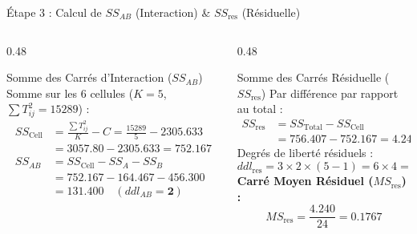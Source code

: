 \documentclass[aspectratio=169,10pt]{beamer}
\begin{document}
\begin{frame}{Étape 3 : Calcul de $SS_{AB}$ (Interaction) \& $SS_{\text{res}}$ (Résiduelle)}
  \begin{columns}[onlytextwidth, T]
    \begin{column}{0.48\linewidth}
      \begin{conceptbox}{Somme des Carrés d'Interaction ($SS_{AB}$)}
        \small
        Somme sur les 6 cellules ($K=5$, $\sum T_{ij}^2 = 15289$) :
        \begin{align*}
          SS_{\text{Cell}} &= \frac{\sum T_{ij}^2}{K} - C = \frac{15289}{5} - 2305.633 \\
          &= 3057.80 - 2305.633 = \mathbf{752.167} \\[1mm]
          SS_{AB} &= SS_{\text{Cell}} - SS_A - SS_B \\
          &= 752.167 - 164.467 - 456.300 \\
          &= \mathbf{131.400} \quad (ddl_{AB} = \mathbf{2})
        \end{align*}
      \end{conceptbox}
    \end{column}
    \begin{column}{0.48\linewidth}
      \begin{conceptbox}{Somme des Carrés Résiduelle ($SS_{\text{res}}$)}
        \small
        Par différence par rapport au total :
        \begin{align*}
          SS_{\text{res}} &= SS_{\text{Total}} - SS_{\text{Cell}} \\
          &= 756.407 - 752.167 = \mathbf{4.240}
        \end{align*}
        Degrés de liberté résiduels :
        \begin{equation*}
          ddl_{\text{res}} = 3 \times 2 \times (5 - 1) = 6 \times 4 = \mathbf{24}
        \end{equation*}
        \textbf{Carré Moyen Résiduel ($MS_{\text{res}}$) :}
        \begin{equation*}
          MS_{\text{res}} = \frac{4.240}{24} = \mathbf{0.1767}
        \end{equation*}
      \end{conceptbox}
    \end{column}
  \end{columns}
\end{frame}
\end{document}
